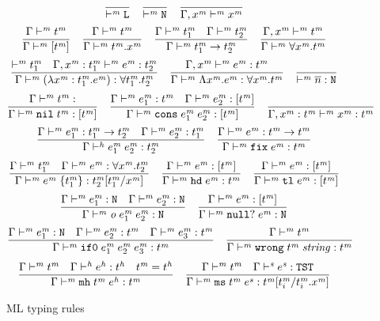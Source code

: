 \begin{figure}[p]
\[
\frac
{}
{ \vdash^{\mathit{m}} \mathtt{L}}
\quad
\frac
{}
{ \vdash^{\mathit{m}} \mathtt{N}}
\quad
\frac
{}
{\Gamma , x^{\mathit{m}} \vdash^{\mathit{m}} x^{\mathit{m}}}
\]
\[
\frac
{\Gamma \vdash^{\mathit{m}} t^{\mathit{m}}}
{\Gamma \vdash^{\mathit{m}} [t^{\mathit{m}}]}
\quad
\frac
{\Gamma \vdash^{\mathit{m}} t^{\mathit{m}}}
{\Gamma \vdash^{\mathit{m}} t^{\mathit{m}} . x^{\mathit{m}}}
\quad
\frac
{\Gamma \vdash^{\mathit{m}} t^{\mathit{m}}_{1} \quad \Gamma \vdash^{\mathit{m}} t^{\mathit{m}}_{2}}
{\Gamma \vdash^{\mathit{m}} t^{\mathit{m}}_{1} \rightarrow t^{\mathit{m}}_{2}}
\quad
\frac
{\Gamma, x^{\mathit{m}} \vdash^{\mathit{m}} t^{\mathit{m}}}
{\Gamma \vdash^{\mathit{m}} \forall x^{\mathit{m}} . t^{\mathit{m}}}
\]
\bigskip
\[
\frac
{ \vdash^{\mathit{m}} t^{\mathit{m}}_{1} \quad \Gamma , x^{\mathit{m}} : t^{\mathit{m}}_{1} \vdash^{\mathit{m}} e^{\mathit{m}} : t^{\mathit{m}}_{2}}
{\Gamma \vdash^{\mathit{m}} (\lambda x^{\mathit{m}} : t^{\mathit{m}}_{1} . e^{\mathit{m}}) : \forall t^{\mathit{m}}_{1} . t^{\mathit{m}}_{2}}
\quad
\frac
{\Gamma , x^{\mathit{m}} \vdash^{\mathit{m}} e^{\mathit{m}} : t^{\mathit{m}}}
{\Gamma \vdash^{\mathit{m}} \Lambda x^{\mathit{m}} . e^{\mathit{m}} : \forall x^{\mathit{m}} . t^{\mathit{m}}}
\quad
\frac
{}
{ \vdash^{\mathit{m}} \overline{n} : \mathtt{N}}
\]
\[
\frac
{\judem{\env}{\vartym}}
{\judem{\env}{\expnils{\vartym}}{\tylist{\vartym}}}
\quad
\frac
{\judem{\env}{\first{\varexpm}}{\vartym} \quad \judem{\env}{\second{\varexpm}}{\tylist{\vartym}}}
{\judem{\env}{\expcons{\first{\varexpm}}{\second{\varexpm}}}{\tylist{\vartym}}}
\quad
\frac
{}
{\judem{\envexte{\varvarm}{\vartym}}{\varvarm}{\vartym}}
\]
\[
\frac
{\Gamma \vdash^{\mathit{m}} e^{\mathit{m}}_{1} : t^{\mathit{m}}_{1} \rightarrow t^{\mathit{m}}_{2} \quad \Gamma \vdash^{\mathit{m}} e^{\mathit{m}}_{2} : t^{\mathit{m}}_{1}}
{\Gamma\vdash^{\mathit{h}}e^{\mathit{m}}_{1} \; e^{\mathit{m}}_{2}:t^{\mathit{m}}_{2}}
\quad
\frac
{\Gamma \vdash^{\mathit{m}} e^{\mathit{m}} : t^{\mathit{m}} \rightarrow t^{\mathit{m}}}
{\Gamma \vdash^{\mathit{m}} \mathtt{fix} \; e^{\mathit{m}} : t^{\mathit{m}}}
\]
\[
\frac
{\Gamma \vdash^{\mathit{m}} t^{\mathit{m}}_{1} \quad \Gamma \vdash^{\mathit{m}} e^{\mathit{m}} : \forall x^{\mathit{m}} . t^{\mathit{m}}_{2}}
{\Gamma \vdash^{\mathit{m}} e^{\mathit{m}} \; \lbrace t^{\mathit{m}}_{1} \rbrace : t^{\mathit{m}}_{2}[t^{\mathit{m}}_{1}/x^{\mathit{m}}]}
\quad
\frac
{\Gamma \vdash^{\mathit{m}} e^{\mathit{m}} : [t^{\mathit{m}}]}
{\Gamma \vdash^{\mathit{m}} \mathtt{hd} \; e^{\mathit{m}} : t^{\mathit{m}}}
\quad
\frac
{\Gamma \vdash^{\mathit{m}} e^{\mathit{m}} : [t^{\mathit{m}}]}
{\Gamma \vdash^{\mathit{m}} \mathtt{tl} \; e^{\mathit{m}} : [t^{\mathit{m}}]}
\]
\[
\frac
{\Gamma \vdash^{\mathit{m}} e^{\mathit{m}}_{1} : \mathtt{N} \quad \Gamma \vdash^{\mathit{m}} e^{\mathit{m}}_{2} : \mathtt{N}}
{\Gamma \vdash^{\mathit{m}} \mathit{o} \; e^{\mathit{m}}_{1} \; e^{\mathit{m}}_{2} : \mathtt{N}}
\quad
\frac
{\Gamma \vdash^{\mathit{m}} e^{\mathit{m}} : [t^{\mathit{m}}]}
{\Gamma \vdash^{\mathit{m}} \mathtt{null?} \; e^{\mathit{m}} : \mathtt{N}}
\]
\[
\frac
{\Gamma \vdash^{\mathit{m}} e^{\mathit{m}}_{1} : \mathtt{N} \quad \Gamma \vdash^{\mathit{m}} e^{\mathit{m}}_{2} : t^{\mathit{m}} \quad \Gamma \vdash^{\mathit{m}} e^{\mathit{m}}_{3} : t^{\mathit{m}}}
{\Gamma \vdash^{\mathit{m}} \mathtt{if0} \; e^{\mathit{m}}_{1} \; e^{\mathit{m}}_{2} \; e^{\mathit{m}}_{3} : t^{\mathit{m}}}
\quad
\frac
{\Gamma \vdash^{\mathit{m}} t^{\mathit{m}}}
{\Gamma \vdash^{\mathit{m}} \mathtt{wrong} \; t^{\mathit{m}} \; \mathit{string} : t^{\mathit{m}}}
\]
\[
\frac
{\Gamma \vdash^{\mathit{m}} t^{\mathit{m}} \quad \Gamma \vdash^{\mathit{h}} e^{\mathit{h}} : t^{\mathit{h}} \quad t^{\mathit{m}}=t^{\mathit{h}}}
{\Gamma \vdash^{\mathit{m}} \mathtt{mh} \; t^{\mathit{m}} \; e^{\mathit{h}} : t^{\mathit{m}}}
\quad
\frac
{\Gamma \vdash^{\mathit{m}} t^{\mathit{m}} \quad \Gamma \vdash^{\mathit{s}} e^{\mathit{s}} : \mathtt{TST}}
{\Gamma \vdash^{\mathit{m}} \mathtt{ms} \; t^{\mathit{m}} \; e^{\mathit{s}} : t^{\mathit{m}}[t^{\mathit{m}}_{i}/t^{\mathit{m}}_{i} . x^{\mathit{m}}]}
\]
\caption{ML typing rules}
\label{mtr}
\end{figure}